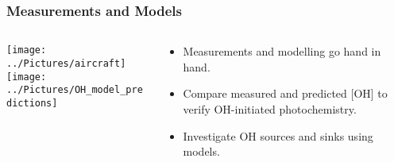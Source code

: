 \begin{frame}
    \frametitle{Measurements and Models}
    \vspace{-7mm}

    \begin{columns}[onlytextwidth]
        \begin{column}{0.4\textwidth}
            \begin{center}
                \texttt{[image: ../Pictures/aircraft]} \\ \vspace{-3mm}
                \hbox{}
                \vspace{5mm}
                \texttt{[image: ../Pictures/OH\_model\_predictions]} \\ \vspace{-3mm}
                \hbox{}
            \end{center}
        \end{column}%
        \begin{column}{0.6\textwidth}
            \begin{itemize}
                \item Measurements and modelling go hand in hand. \vspace{3mm}
                \item Compare measured and predicted [OH] to verify OH-initiated photochemistry. \vspace{2mm}
                \item Investigate OH sources and sinks using models.
            \end{itemize}
        \end{column}
    \end{columns}

\end{frame}
